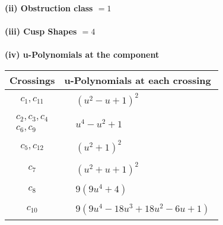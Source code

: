 \documentclass[1p]{elsarticle_modified}
\theoremstyle{definition}
\begin{document}
\flushleft \textbf{(ii) Obstruction class $= 1$}\\~\\
\flushleft \textbf{(iii) Cusp Shapes $= 4$}\\~\\
\newpage\renewcommand{\arraystretch}{1}
\flushleft \textbf{(iv) u-Polynomials at the component}\newline \\
\begin{tabular}{m{50pt}|m{274pt}}
Crossings & \hspace{64pt}u-Polynomials at each crossing \\
\hline $$\begin{aligned}c_{1},c_{11}\end{aligned}$$&$\begin{aligned}
&(u^2- u+1)^2
\end{aligned}$\\
\hline $$\begin{aligned}c_{2},c_{3},c_{4}\\c_{6},c_{9}\end{aligned}$$&$\begin{aligned}
&u^4- u^2+1
\end{aligned}$\\
\hline $$\begin{aligned}c_{5},c_{12}\end{aligned}$$&$\begin{aligned}
&(u^2+1)^2
\end{aligned}$\\
\hline $$\begin{aligned}c_{7}\end{aligned}$$&$\begin{aligned}
&(u^2+u+1)^2
\end{aligned}$\\
\hline $$\begin{aligned}c_{8}\end{aligned}$$&$\begin{aligned}
&9(9 u^4+4)
\end{aligned}$\\
\hline $$\begin{aligned}c_{10}\end{aligned}$$&$\begin{aligned}
&9(9 u^4-18 u^3+18 u^2-6 u+1)
\end{aligned}$\\
\hline
\end{tabular}\\~\\
\end{document}
